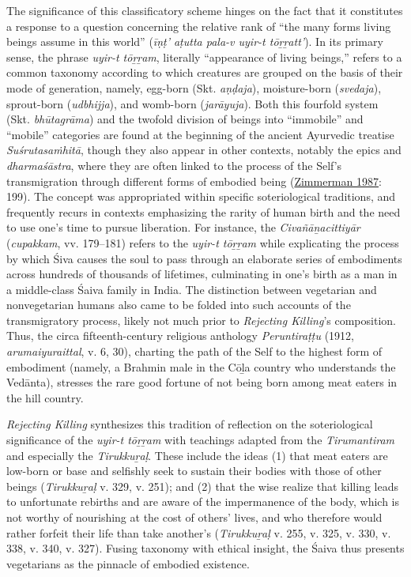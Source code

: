 The significance of this classificatory scheme hinges on the fact that it constitutes a response to a question concerning the relative rank of “the many forms living beings assume in this world” (\emph{īṇṭ’ aṭutta pala-v uyir-t tōṟṟatt’}). In its primary sense, the phrase \emph{uyir-t tōṟṟam}, literally “appearance of living beings,” refers to a common taxonomy according to which creatures are grouped on the basis of their mode of generation, namely, egg-born (Skt. \emph{aṇḍaja}), moisture-born (\emph{svedaja}), sprout-born (\emph{udbhijja}), and womb-born (\emph{jarāyuja}). Both this fourfold system (Skt. \emph{bhūtagrāma}) and the twofold division of beings into “immobile” and “mobile” categories are found at the beginning of the ancient Ayurvedic treatise \emph{{Suśrutasaṁhitā}}, though they also appear in other contexts, notably the epics and \emph{dharmaśāstra}, where they are often linked to the process of the Self’s transmigration through different forms of embodied being (\hyperref[Zimmerman1987]{Zimmerman 1987}: 199). The concept was appropriated within specific soteriological traditions, and frequently recurs in contexts emphasizing the rarity of human birth and the need to use one’s time to pursue liberation. For instance, the \emph{{Civañāṉacittiyār}} (\emph{cupakkam}, vv. 179–181) refers to the \emph{uyir-t tōṟṟam} while explicating the process by which Śiva causes the soul to pass through an elaborate series of embodiments across hundreds of thousands of lifetimes, culminating in one’s birth as a man in a middle-class Śaiva family in India. The distinction between vegetarian and nonvegetarian humans also came to be folded into such accounts of the transmigratory process, likely not much prior to \emph{Rejecting Killing}’s composition. Thus, the circa fifteenth-century religious anthology \emph{{Peruntiraṭṭu}} (1912, \emph{arumaiyuraittal}, v. 6, 30), charting the path of the Self to the highest form of embodiment (namely, a Brahmin male in the Cōḻa country who understands the Vedānta), stresses the rare good fortune of not being born among meat eaters in the hill country.


\emph{Rejecting Killing} synthesizes this tradition of reflection on the soteriological significance of the \emph{uyir-t tōṟṟam} with teachings adapted from the \emph{{Tirumantiram}} and especially the \emph{{Tirukkuṟaḷ}}. These include the ideas (1) that meat eaters are low-born or base and selfishly seek to sustain their bodies with those of other beings (\emph{{Tirukkuṟaḷ}} v. 329, v. 251); and (2) that the wise realize that killing leads to unfortunate rebirths and are aware of the impermanence of the body, which is not worthy of nourishing at the cost of others’ lives, and who therefore would rather forfeit their life than take another’s (\emph{{Tirukkuṟaḷ}} v. 255, v. 325, v. 330, v. 338, v. 340, v. 327). Fusing taxonomy with ethical insight, the Śaiva thus presents vegetarians as the pinnacle of embodied existence. 


